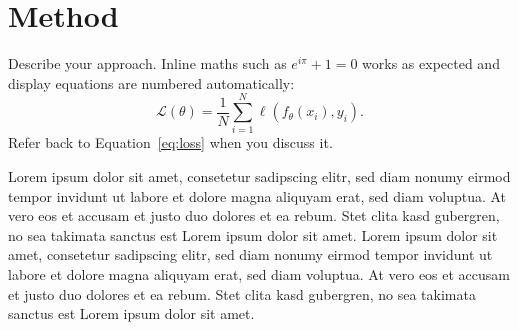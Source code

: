 \section{Method}
Describe your approach. Inline maths such as $e^{i\pi}+1=0$ works as
expected and display equations are numbered automatically:
\begin{equation}
  \mathcal{L}(\theta)=\frac{1}{N}\sum_{i=1}^{N}\ell\!\left(f_\theta(x_i),y_i\right).
  \label{eq:loss}
\end{equation}
Refer back to Equation~\eqref{eq:loss} when you discuss it.

Lorem ipsum dolor sit amet, consetetur sadipscing elitr, sed diam nonumy 
eirmod tempor invidunt ut labore et dolore magna aliquyam erat, sed diam 
voluptua. At vero eos et accusam et justo duo dolores et ea rebum. Stet 
clita kasd gubergren, no sea takimata sanctus est Lorem ipsum dolor sit 
amet. Lorem ipsum dolor sit amet, consetetur sadipscing elitr, sed diam 
nonumy eirmod tempor invidunt ut labore et dolore magna aliquyam erat, sed 
diam voluptua. At vero eos et accusam et justo duo dolores et ea rebum. Stet 
clita kasd gubergren, no sea takimata sanctus est Lorem ipsum dolor sit amet.